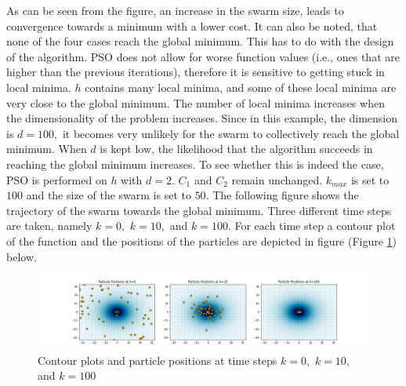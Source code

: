 As can be seen from the figure, an increase in the swarm size, leads to convergence towards a minimum with a lower cost. It can also be noted, that none of the four cases reach the global minimum. This has to do with the design of the algorithm. PSO does not allow for worse function values (i.e., ones that are higher than the previous iterations), therefore it is sensitive to getting stuck in local minima. $h$ contains many local minima, and some of these local minima are very close to the global minimum. The number of local minima increases when the dimensionality of the problem increases. Since in this example, the dimension is $d=100,$ it becomes very unlikely for the swarm to collectively reach the global minimum. When $d$ is kept low, the likelihood that the algorithm succeeds in reaching the global minimum increases. To see whether this is indeed the case, PSO is performed on $h$ with $d=2.$ $C_{1}$ and $C_{2}$ remain unchanged. $k_{max}$ is set to $100$ and the size of the swarm is set to $50.$ The following figure shows the trajectory of the swarm towards the global minimum. Three different time steps are taken, namely $k=0,$ $k=10,$ and $k=100.$ For each time step a contour plot of the function and the positions of the particles are depicted in figure (Figure \ref{fig:PSO_2D_swarm}) below.
\begin{figure}[h!]
    \centering
        \includegraphics[width=1\textwidth]{Pictures/PSO_ackleys_2D_swarm.png}
    \caption{Contour plots and particle positions at time steps $k=0,$ $k=10,$ and $k=100$}\label{fig:PSO_2D_swarm}
\end{figure}\\
\newpage

